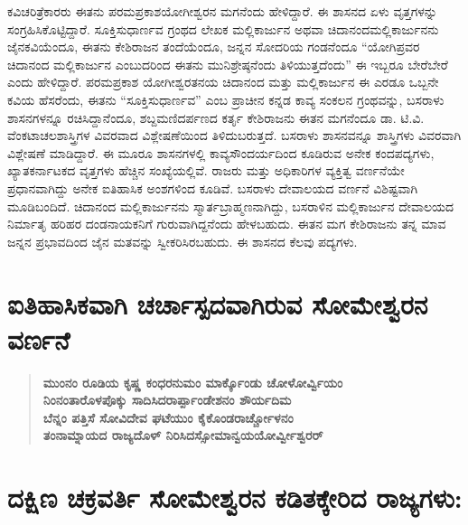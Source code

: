 ಕವಿಚರಿತ್ರೆಕಾರರು ಈತನು ಪರಮಪ್ರಕಾಶಯೋಗೀಶ್ವರನ ಮಗನೆಂದು ಹೇಳಿದ್ದಾರೆ. ಈ ಶಾಸನದ ಏಳು ವೃತ್ತಗಳನ್ನು ಸಂಗ್ರಹಿಸಿಕೊಟ್ಟಿದ್ದಾರೆ. ಸೂಕ್ತಿಸುಧಾರ್ಣವ ಗ್ರಂಥದ ಲೇಖಕ ಮಲ್ಲಿಕಾರ್ಜುನ ಅಥವಾ ಚಿದಾನಂದಮಲ್ಲಿಕಾರ್ಜುನನು ಜೈನಕವಿಯೆಂದೂ, ಈತನು ಕೇಶಿರಾಜನ ತಂದೆಯೆಂದೂ, ಜನ್ನನ ಸೋದರಿಯ ಗಂಡನೆಂದೂ “ಯೋಗಿಪ್ರವರ ಚಿದಾನಂದ ಮಲ್ಲಿಕಾರ್ಜುನ ಎಂಬುದರಿಂದ ಈತನು ಮುನಿಶ್ರೇಷ್ಠನೆಂದು ತಿಳಿಯುತ್ತದೆಂದು” ಈ ಇಬ್ಬರೂ ಬೇರೆಬೇರೆ ಎಂದು ಹೇಳಿದ್ದಾರೆ. ಪರಮಪ್ರಕಾಶ ಯೋಗೀಶ್ವರತನಯ ಚಿದಾನಂದ ಮತ್ತು ಮಲ್ಲಿಕಾರ್ಜುನ ಈ ಎರಡೂ ಒಬ್ಬನೇ ಕವಿಯ ಹೆಸರೆಂದು, ಈತನು “ಸೂಕ್ತಿಸುಧಾರ್ಣವ” ಎಂಬ ಪ್ರಾಚೀನ ಕನ್ನಡ ಕಾವ್ಯ ಸಂಕಲನ ಗ್ರಂಥವನ್ನು, ಬಸರಾಳು ಶಾಸನಗಳನ್ನೂ ರಚಿಸಿದ್ದಾನೆಂದೂ, ಶಬ್ದಮಣಿದರ್ಪಣದ ಕರ್ತೃ ಕೇಶಿರಾಜನು ಈತನ ಮಗನೆಂದೂ ಡಾ. ಟಿ.ವಿ. ವೆಂಕಟಾಚಲಶಾಸ್ತ್ರಿಗಳ ವಿವರವಾದ ವಿಶ್ಲೇಷಣೆಯಿಂದ ತಿಳಿದುಬರುತ್ತದೆ. ಬಸರಾಳು ಶಾಸನವನ್ನೂ ಶಾಸ್ತ್ರಿಗಳು ವಿವರವಾಗಿ ವಿಶ್ಲೇಷಣೆ ಮಾಡಿದ್ದಾರೆ. ಈ ಮೂರೂ ಶಾಸನಗಳಲ್ಲಿ ಕಾವ್ಯಸೌಂದರ್ಯದಿಂದ ಕೂಡಿರುವ ಅನೇಕ ಕಂದಪದ್ಯಗಳು, ಖ್ಯಾತಕರ್ನಾಟಕದ ವೃತ್ತಗಳು ಹೆಚ್ಚಿನ ಸಂಖ್ಯೆಯಲ್ಲಿವೆ. ರಾಜರು ಮತ್ತು ಅಧಿಕಾರಿಗಳ ವ್ಯಕ್ತಿತ್ವ ವರ್ಣನೆಯೇ ಪ್ರಧಾನವಾಗಿದ್ದು ಅನೇಕ ಐತಿಹಾಸಿಕ ಅಂಶಗಳಿಂದ ಕೂಡಿವೆ. ಬಸರಾಳು ದೇವಾಲಯದ ವರ್ಣನೆ ವಿಶಿಷ್ಟವಾಗಿ ಮೂಡಿಬಂದಿದೆ. ಚಿದಾನಂದ ಮಲ್ಲಿಕಾರ್ಜುನನು ಸ್ಮಾರ್ತ\break ಬ್ರಾಹ್ಮಣನಾಗಿದ್ದು, ಬಸರಾಳಿನ ಮಲ್ಲಿಕಾರ್ಜುನ ದೇವಾಲಯದ ನಿರ್ಮಾತೃ ಹರಿಹರ ದಂಡನಾಯಕನಿಗೆ ಗುರುವಾಗಿದ್ದನೆಂದು ಹೇಳಬಹುದು. ಈತನ ಮಗ ಕೇಶಿರಾಜನು ತನ್ನ ಮಾವ ಜನ್ನನ ಪ್ರಭಾವದಿಂದ ಜೈನ ಮತವನ್ನು ಸ್ವೀಕರಿಸಿರಬಹುದು. ಈ ಶಾಸನದ ಕೆಲವು ಪದ್ಯಗಳು.

\section*{ಐತಿಹಾಸಿಕವಾಗಿ ಚರ್ಚಾಸ್ಪದವಾಗಿರುವ ಸೋಮೇಶ್ವರನ ವರ್ಣನೆ}

\begin{verse}
\textbf{ಮುಂನಂ ರೂಡಿಯ ಕೃಷ್ಣ ಕಂಧರನುಮಂ ಮಾರ್ಕ್ಕೊಂಡು ಚೋಳೋರ್ವ್ವಿಯಂ \\ ನಿಂನಂತಾರೊಳಪೊಕ್ಕು ಸಾದಿಸಿದರಾರ್ಪ್ಪಾಂಡೇಶನಂ ಶೌರ್ಯದಿಮ \\ ಬೆನ್ನಂ ಪತ್ತಿಸೆ ಸೋವಿದೇವ ಘಟೆಯುಂ ಕೈಕೊಂಡರಾರ್ಚ್ಚೋಳನಂ \\ ತಂನಾಮ್ನಾಯದ ರಾಜ್ಯದೊಳ್​ ನಿರಿಸಿದಸ್ಸೋಮಾನ್ವಯಯೋರ್ವ್ವೀಶ್ವರರ್​}
\end{verse}

\vskip 2pt

\section*{ದಕ್ಷಿಣ ಚಕ್ರವರ್ತಿ ಸೋಮೇಶ್ವರನ ಕಡಿತಕ್ಕೇರಿದ ರಾಜ್ಯಗಳು:}

